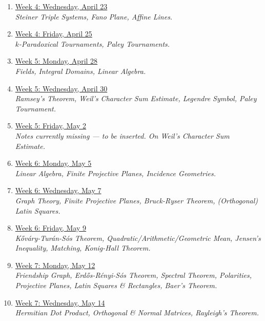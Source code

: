 \documentclass[12pt]{article}
\theoremstyle{remark}
\begin{document}
\begin{enumerate}
\item \hyperref[11]{Week 4: Wednesday, April 23 }
\\\indent\textit{Steiner Triple Systems, Fano Plane, Affine Lines.}

\item \hyperref[12]{Week 4: Friday, April 25 }
\\\indent\textit{$k$-Paradoxical Tournaments, Paley Tournaments.}

\item \hyperref[13]{Week 5: Monday, April 28 }
\\\indent\textit{Fields, Integral Domains, Linear Algebra.}

\item \hyperref[14]{Week 5: Wednesday, April 30 }
\\\indent\textit{Ramsey's Theorem, Weil's Character Sum Estimate, Legendre Symbol, Paley Tournament.} 

\item \hyperref[15]{Week 5: Friday, May 2 }
\\\indent\textit{Notes currently missing --- to be inserted. On Weil's Character Sum Estimate.}

\item \hyperref[16]{Week 6: Monday, May 5 }
\\\indent\textit{Linear Algebra, Finite Projective Planes, Incidence Geometries.}

\item \hyperref[17]{Week 6: Wednesday, May 7 }
\\\indent\textit{Graph Theory, Finite Projective Planes, Bruck-Ryser Theorem, (Orthogonal) Latin Squares.}

\item \hyperref[18]{Week 6: Friday, May 9 }
\\\indent\textit{K\H{o}v\'ary-Tur\'an-S\'os Theorem, Quadratic/Arithmetic/Geometric Mean, Jensen's Inequality, Matching, Konig-Hall Theorem.}

\item \hyperref[19]{Week 7: Monday, May 12 }
\\\indent\textit{Friendship Graph, Erd\H{o}s-R\'enyi-S\'os Theorem, Spectral Theorem, Polarities, Projective Planes, Latin Squares \& Rectangles, Baer's Theorem.} 

\item \hyperref[20]{Week 7: Wednesday, May 14 }
\\\indent\textit{Hermitian Dot Product, Orthogonal \& Normal Matrices, Rayleigh's Theorem.}


\end{enumerate}
\end{document}
